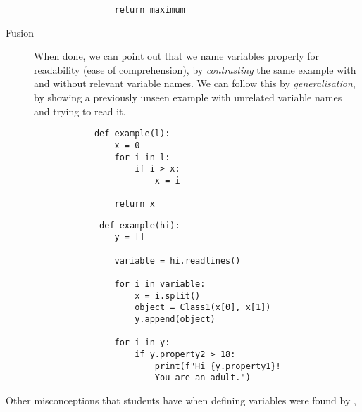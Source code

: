 \begin{description}
\begin{minipage}[t]{0.45\columnwidth}
\begin{verbatim}
                return maximum
      \end{verbatim}
    \end{minipage}
\newline
    \item [Fusion] When done, we can point out that we name variables 
properly for readability (ease of comprehension), by \emph{contrasting}
 the same example with and without relevant variable names. We can 
follow this by \emph{generalisation}, by showing a previously unseen 
example with unrelated variable names and trying to read it.
    
    \hfill
     \begin{minipage}[t]{0.45\columnwidth}
        \begin{verbatim}
            def example(l):
                x = 0
                for i in l:
                    if i > x:
                        x = i
    
                return x
        \end{verbatim}
    \end{minipage}
\hfill
    \begin{minipage}[t]{0.45\columnwidth}
        \begin{verbatim}
             def example(hi):
                y = []
                
                variable = hi.readlines()
    
                for i in variable:
                    x = i.split()
                    object = Class1(x[0], x[1])
                    y.append(object)
                    
                for i in y:
                    if y.property2 > 18:
                        print(f"Hi {y.property1}! 
                        You are an adult.")
        \end{verbatim}
    \end{minipage}
\hfill
    
\end{description}
\vspace{5pt}
Other misconceptions that students have when defining variables were found 
by \textcite{GuoMarkelZhang2020},

